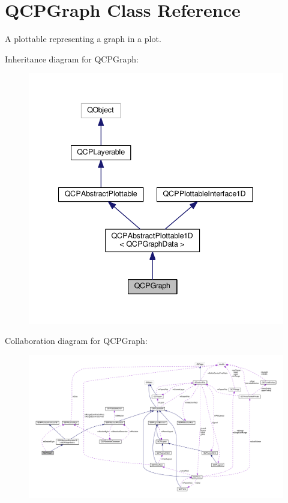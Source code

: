 \hypertarget{classQCPGraph}{}\section{Q\+C\+P\+Graph Class Reference}
\label{classQCPGraph}


A plottable representing a graph in a plot.  




Inheritance diagram for Q\+C\+P\+Graph\+:
\nopagebreak
\begin{figure}[H]
\begin{center}
\leavevmode
\includegraphics[width=340pt]{classQCPGraph__inherit__graph}
\end{center}
\end{figure}


Collaboration diagram for Q\+C\+P\+Graph\+:
\nopagebreak
\begin{figure}[H]
\begin{center}
\leavevmode
\includegraphics[width=350pt]{classQCPGraph__coll__graph}
\end{center}
\end{figure}
